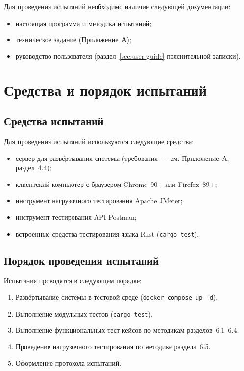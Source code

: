 Для проведения испытаний необходимо наличие следующей документации:
\begin{itemize}
  \item настоящая программа и методика испытаний;
  \item техническое задание (Приложение~А);
  \item руководство пользователя (раздел~\ref{sec:user-guide} пояснительной записки).
\end{itemize}

\section{Средства и порядок испытаний}

\subsection{Средства испытаний}

Для проведения испытаний используются следующие средства:
\begin{itemize}
  \item сервер для развёртывания системы (требования~--- см. Приложение~А, раздел~4.4);
  \item клиентский компьютер с браузером Chrome~90+ или Firefox~89+;
  \item инструмент нагрузочного тестирования Apache JMeter;
  \item инструмент тестирования API Postman;
  \item встроенные средства тестирования языка Rust (\texttt{cargo test}).
\end{itemize}

\subsection{Порядок проведения испытаний}

Испытания проводятся в следующем порядке:
\begin{enumerate}
  \item Развёртывание системы в тестовой среде (\texttt{docker compose up -d}).
  \item Выполнение модульных тестов (\texttt{cargo test}).
  \item Выполнение функциональных тест-кейсов по методикам разделов~6.1--6.4.
  \item Проведение нагрузочного тестирования по методике раздела~6.5.
  \item Оформление протокола испытаний.
\end{enumerate}

